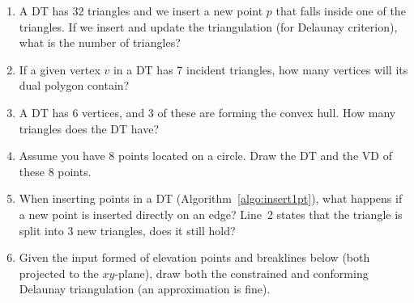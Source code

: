 \begin{enumerate}
  \item A DT has 32 triangles and we insert a new point $p$ that falls inside one of the triangles. If we insert and update the triangulation (for Delaunay criterion), what is the number of triangles?
  \item If a given vertex $v$ in a DT has 7 incident triangles, how many vertices will its dual polygon contain?
  \item A DT has 6 vertices, and 3 of these are forming the convex hull. How many triangles does the DT have?
  \item Assume you have 8 points located on a circle. Draw the DT and the VD of these 8 points.
  \item When inserting points in a DT (Algorithm~\ref{algo:insert1pt}), what happens if a new point is inserted directly on an edge? Line~2 states that the triangle is split into 3 new triangles, does it still hold?
  \item Given the input formed of elevation points and breaklines below (both projected to the $xy$-plane), draw both the constrained and conforming Delaunay triangulation (an approximation is fine).
  \\ \\
\end{enumerate}
